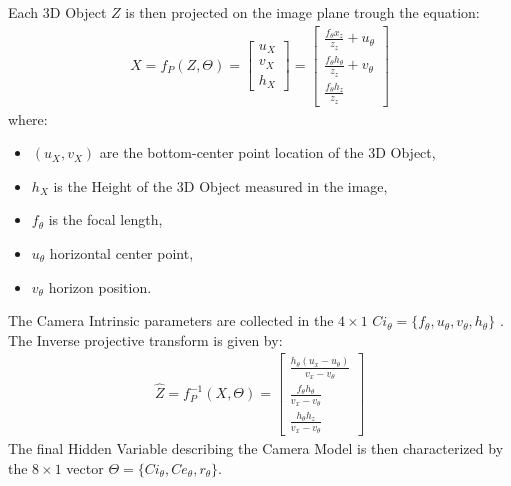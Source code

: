 Each 3D Object $Z$ is then projected on the image plane trough the equation: 
\begin{eqnarray} \label{eqn: Perspective Projection}
X=f_P(Z,\Theta)= \left[
\begin{array}{c}
u_X \\
v_X\\
h_X
\end{array}
\right]
= \left[
\begin{array}{c}
\frac{f_{\theta} x_z}{z_z} +u_{\theta} \\
\frac{f_{\theta} h_{\theta}}{z_z} +v_{\theta} \\
\frac{f_{\theta} h_z}{z_z}
\end{array}
\right]
\end{eqnarray}
where:
\begin{itemize}
\item $(u_X,v_X)$ are the bottom-center point location of the 3D Object,
\item $h_X$ is the Height of the 3D Object measured in the image,
\item $f_{\theta}$ is the focal length,
\item $u_{\theta}$ horizontal center point,
\item $v_{\theta}$ horizon position.
\end{itemize}
The Camera Intrinsic parameters are collected in the $4\times1$
$Ci_{\theta}=\{ f_{\theta}, u_{\theta}, v_{\theta}, h_{\theta} \}$ .\\
The Inverse projective transform is given by:
\begin{eqnarray} \label{eqn: Inverse Perspective Projection}
\hat{Z} = f_P^{-1}(X,\Theta)=
 \left[
\begin{array}{c}
\frac{ h_{\theta} (u_x-u_{\theta}) }{ v_x-v_{\theta}} \\
\frac{ f_{\theta} h_{\theta} }{v_x-v_{\theta}} \\
\frac{ h_{\theta} h_z}{v_x-v_{\theta}}
\end{array}
\right]
\end{eqnarray}
The final Hidden Variable describing the Camera Model is then characterized by the
$8\times1$ vector $\Theta=\{ Ci_{\theta},Ce_{\theta},r_{\theta}\}$.\\

